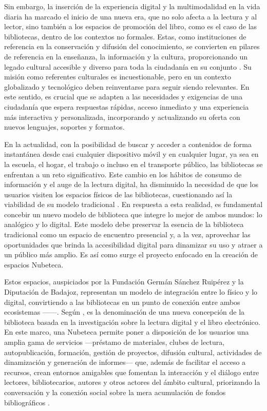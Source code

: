 \documentclass[spanish]{textolivre}
\begin{document}
Sin embargo, la inserción de la experiencia digital y la multimodalidad en la vida diaria ha marcado el inicio de una nueva era, que no solo afecta a la lectura y al lector, sino también a los espacios de promoción del libro, como es el caso de las bibliotecas, dentro de los contextos no formales. Estas, como instituciones de referencia en la conservación y difusión del conocimiento, se convierten en pilares de referencia en la enseñanza, la información y la cultura, proporcionando un legado cultural accesible y diverso para toda la ciudadanía en su conjunto \cite{yarrow_bibliotecas_2009,romero_oliva_entre_2023}. Su misión como referentes culturales es incuestionable, pero en un contexto globalizado y tecnológico deben reinventarse para seguir siendo relevantes. En este sentido, es crucial que se adapten a las necesidades y exigencias de una ciudadanía que espera respuestas rápidas, acceso inmediato y una experiencia más interactiva y personalizada, incorporando y actualizando su oferta con nuevos lenguajes, soportes y formatos.

En la actualidad, con la posibilidad de buscar y acceder a contenidos de forma instantánea desde casi cualquier dispositivo móvil y en cualquier lugar, ya sea en la escuela, el hogar, el trabajo o incluso en el transporte público, las bibliotecas se enfrentan a un reto significativo. Este cambio en los hábitos de consumo de información y el auge de la lectura digital, ha disminuido la necesidad de que los usuarios visiten los espacios físicos de las bibliotecas, cuestionando así la viabilidad de su modelo tradicional \cite{dantas_adaptabilidad_2017}. En respuesta a esta realidad, es fundamental concebir un nuevo modelo de biblioteca que integre lo mejor de ambos mundos: lo analógico y lo digital. Este modelo debe preservar la esencia de la biblioteca tradicional como un espacio de encuentro presencial y, a la vez, aprovechar las oportunidades que brinda la accesibilidad digital para dinamizar su uso y atraer a un público más amplio. Es así como surge el proyecto enfocado en la creación de espacios Nubeteca.

Estos espacios, auspiciados por la Fundación Germán Sánchez Ruipérez y la Diputación de Badajoz, representan un modelo de integración entre lo físico y lo digital, convirtiendo a las bibliotecas en un punto de conexión entre ambos ecosistemas ——. Según \textcite{valbuena_impacto_2019}, es la denominación de una nueva concepción de la biblioteca basada en la investigación sobre la lectura digital y el libro electrónico. En este marco, una Nubeteca permite poner  a disposición de los usuarios una amplia gama de servicios —préstamo de materiales, clubes de lectura, autopublicación, formación, gestión de proyectos, difusión cultural, actividades de dinamización y generación de informes— que, además de facilitar el acceso a recursos, crean entornos amigables que fomentan la interacción y el diálogo entre lectores, bibliotecarios, autores y otros actores del ámbito cultural, priorizando la conversación y la conexión social sobre la mera acumulación de fondos bibliográficos \cite{moreno_mulas_florencia_2019}.
\end{document}
